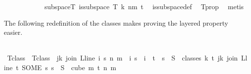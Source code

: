 \begin{isabellebody}
\isanewline
\ \ \ \ \isamarkupfalse%
\isanewline
\isanewline
\ \ \ \ \isamarkupfalse%
\ \isamarkupfalse%
\ subspace{\isacharunderscore}{\kern0pt}T{\isacharcolon}{\kern0pt}\ {\isachardoublequoteopen}is{\isacharunderscore}{\kern0pt}subspace\ T\ {\isacharparenleft}{\kern0pt}k{\isacharplus}{\kern0pt}{}{\isacharparenright}{\kern0pt}\ {\isacharparenleft}{\kern0pt}n{\isacharplus}{\kern0pt}m{\isacharparenright}{\kern0pt}\ {\isacharparenleft}{\kern0pt}t{\isacharplus}{\kern0pt}{}{\isacharparenright}{\kern0pt}{\isachardoublequoteclose}\ \isamarkupfalse%
\ is{\isacharunderscore}{\kern0pt}subspace{\isacharunderscore}{\kern0pt}def\ \isamarkupfalse%
\ T{\isacharunderscore}{\kern0pt}prop\ \isamarkupfalse%
\ metis%
\endisatagproof
{\isafoldproof}%
%
\isadelimproof
%
\endisadelimproof
%
\isadelimdocument
%
\endisadelimdocument
%
\isatagdocument
%
\isamarkuptrue%
%
\begin{isamarkuptext}%
The following redefinition of the classes makes proving the layered property easier.%
\end{isamarkuptext}\isamarkuptrue%
%
\endisatagdocument
{\isafolddocument}%
%
\isadelimdocument
%
\endisadelimdocument
%
\isadelimproof
\ \ \ \ %
\endisadelimproof
%
\isatagproof
{}\isamarkupfalse%
\ T{\isacharunderscore}{\kern0pt}class\ \ {\isachardoublequoteopen}T{\isacharunderscore}{\kern0pt}class\ {\isasymequiv}\ {\isacharparenleft}{\kern0pt}{\isasymlambda}j{\isasymin}{\isacharbraceleft}{\kern0pt}{\isachardot}{\kern0pt}{\isachardot}{\kern0pt}k{\isacharbraceright}{\kern0pt}{\isachardot}{\kern0pt}\ {\isacharbraceleft}{\kern0pt}join\ {\isacharparenleft}{\kern0pt}L{\isacharunderscore}{\kern0pt}line\ i{\isacharparenright}{\kern0pt}\ s\ n\ m\ {\isacharbar}{\kern0pt}\ i\ s\ {\isachardot}{\kern0pt}\ i\ {\isasymin}\ {\isacharbraceleft}{\kern0pt}{\isachardot}{\kern0pt}{\isachardot}{\kern0pt}{\isacharless}{\kern0pt}t{\isacharbraceright}{\kern0pt}\ {\isasymand}\ s\ {\isasymin}\ S\ {\isacharbackquote}{\kern0pt}\ {\isacharparenleft}{\kern0pt}classes\ k\ t\ j{\isacharparenright}{\kern0pt}{\isacharbraceright}{\kern0pt}{\isacharparenright}{\kern0pt}{\isacharparenleft}{\kern0pt}k{\isacharplus}{\kern0pt}{}{\isacharcolon}{\kern0pt}{\isacharequal}{\kern0pt}\ {\isacharbraceleft}{\kern0pt}join\ {\isacharparenleft}{\kern0pt}L{\isacharunderscore}{\kern0pt}line\ t{\isacharparenright}{\kern0pt}\ {\isacharparenleft}{\kern0pt}SOME\ s{\isachardot}{\kern0pt}\ s\ {\isasymin}\ S\ {\isacharbackquote}{\kern0pt}\ {\isacharparenleft}{\kern0pt}cube\ m\ {\isacharparenleft}{\kern0pt}t{\isacharplus}{\kern0pt}{}{\isacharparenright}{\kern0pt}{\isacharparenright}{\kern0pt}{\isacharparenright}{\kern0pt}\ n\ m{\isacharbraceright}{\kern0pt}{\isacharparenright}{\kern0pt}{\isachardoublequoteclose}\isanewline

\end{isabellebody}
